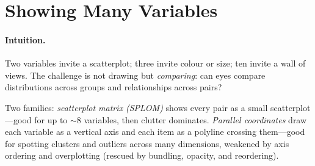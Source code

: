 \section{Showing Many Variables}
\label{sec:many-vars}
\paragraph{Intuition.} Two variables invite a scatterplot; three invite colour or size; ten invite a wall of views. The challenge is not drawing but \emph{comparing}: can eyes compare distributions across groups and relationships across pairs?

Two families: \emph{scatterplot matrix (SPLOM)} shows every pair as a small scatterplot---good for up to $\sim 8$ variables, then clutter dominates. \emph{Parallel coordinates} draw each variable as a vertical axis and each item as a polyline crossing them---good for spotting clusters and outliers across many dimensions, weakened by axis ordering and overplotting (rescued by bundling, opacity, and reordering).

